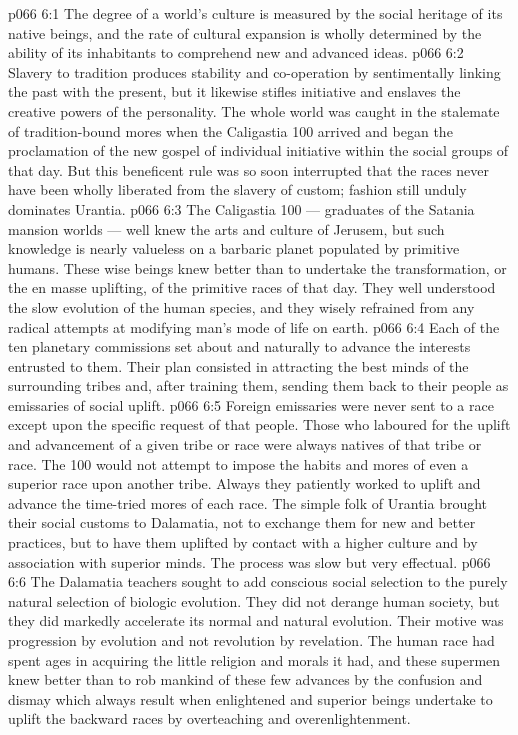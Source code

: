 \vs p066 6:1 The degree of a world’s culture is measured by the social heritage of its native beings, and the rate of cultural expansion is wholly determined by the ability of its inhabitants to comprehend new and advanced ideas.
\vs p066 6:2 Slavery to tradition produces stability and co\hyp{}operation by sentimentally linking the past with the present, but it likewise stifles initiative and enslaves the creative powers of the personality. The whole world was caught in the stalemate of tradition\hyp{}bound mores when the Caligastia 100 arrived and began the proclamation of the new gospel of individual initiative within the social groups of that day. But this beneficent rule was so soon interrupted that the races never have been wholly liberated from the slavery of custom; fashion still unduly dominates Urantia.
\vs p066 6:3 The Caligastia 100 --- graduates of the Satania mansion worlds --- well knew the arts and culture of Jerusem, but such knowledge is nearly valueless on a barbaric planet populated by primitive humans. These wise beings knew better than to undertake the  transformation, or the en masse uplifting, of the primitive races of that day. They well understood the slow evolution of the human species, and they wisely refrained from any radical attempts at modifying man’s mode of life on earth.
\vs p066 6:4 Each of the ten planetary commissions set about  and naturally to advance the interests entrusted to them. Their plan consisted in attracting the best minds of the surrounding tribes and, after training them, sending them back to their people as emissaries of social uplift.
\vs p066 6:5 Foreign emissaries were never sent to a race except upon the specific request of that people. Those who laboured for the uplift and advancement of a given tribe or race were always natives of that tribe or race. The 100 would not attempt to impose the habits and mores of even a superior race upon another tribe. Always they patiently worked to uplift and advance the time\hyp{}tried mores of each race. The simple folk of Urantia brought their social customs to Dalamatia, not to exchange them for new and better practices, but to have them uplifted by contact with a higher culture and by association with superior minds. The process was slow but very effectual.
\vs p066 6:6 The Dalamatia teachers sought to add conscious social selection to the purely natural selection of biologic evolution. They did not derange human society, but they did markedly accelerate its normal and natural evolution. Their motive was progression by evolution and not revolution by revelation. The human race had spent ages in acquiring the little religion and morals it had, and these supermen knew better than to rob mankind of these few advances by the confusion and dismay which always result when enlightened and superior beings undertake to uplift the backward races by overteaching and overenlightenment.
